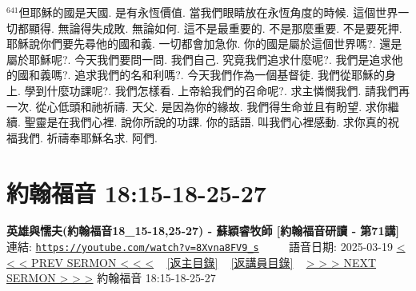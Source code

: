 \documentclass{book}
\begin{document}
$^{641}$但耶穌的國是天國.
是有永恆價值.
當我們眼睛放在永恆角度的時候.
這個世界一切都顯得.
無論得失成敗.
無論如何.
這不是最重要的.
不是那麼重要.
不是要死押.
耶穌說你們要先尋他的國和義.
一切都會加急你.
你的國是屬於這個世界嗎?.
還是屬於耶穌呢?.
今天我們要問一問.
我們自己.
究竟我們追求什麼呢?.
我們是追求他的國和義嗎?.
追求我們的名和利嗎?.
今天我們作為一個基督徒.
我們從耶穌的身上.
學到什麼功課呢?.
我們怎樣看.
上帝給我們的召命呢?.
求主憐憫我們.
請我們再一次.
從心低頭和祂祈禱.
天父.
是因為你的緣故.
我們得生命並且有盼望.
求你繼續.
聖靈是在我們心裡.
說你所說的功課.
你的話語.
叫我們心裡感動.
求你真的祝福我們.
祈禱奉耶穌名求.
阿們.
\newpage



\section{約翰福音 18:15-18-25-27}
\label{sec:8Xvna8FV9_s}
\textbf{英雄與懦夫(約翰福音18\_15-18,25-27) - 蘇穎睿牧師 [約翰福音研讀 - 第71講]}
\newline
\newline
連結: \href{https://youtube.com/watch?v=8Xvna8FV9_s}{\texttt{https://youtube.com/watch?v=8Xvna8FV9\_s}} ~~~~ 語音日期: 2025-03-19
\newline
\newline
\hyperref[sec:Soyt_RP__Tk]{< < < PREV SERMON < < <}
~
\hyperlink{toc}{[返主目錄]}
~
\hyperref[ch:preacher10]{[返講員目錄]}
~
\hyperref[sec:OtTM_EdQEtA]{> > > NEXT SERMON > > >}
\newline
\newline
約翰福音 18:15-18-25-27
\newline
\end{document}
